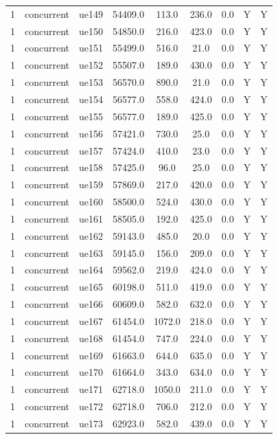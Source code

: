 \begin{table}[ht]
\begin{tabular}{|c|c|c|c|c|c|c|c|c|}
1 & concurrent & ue149 & 54409.0 & 113.0 & 236.0 & 0.0 & Y & Y \\
1 & concurrent & ue150 & 54850.0 & 216.0 & 423.0 & 0.0 & Y & Y \\
1 & concurrent & ue151 & 55499.0 & 516.0 & 21.0 & 0.0 & Y & Y \\
1 & concurrent & ue152 & 55507.0 & 189.0 & 430.0 & 0.0 & Y & Y \\
1 & concurrent & ue153 & 56570.0 & 890.0 & 21.0 & 0.0 & Y & Y \\
1 & concurrent & ue154 & 56577.0 & 558.0 & 424.0 & 0.0 & Y & Y \\
1 & concurrent & ue155 & 56577.0 & 189.0 & 425.0 & 0.0 & Y & Y \\
1 & concurrent & ue156 & 57421.0 & 730.0 & 25.0 & 0.0 & Y & Y \\
1 & concurrent & ue157 & 57424.0 & 410.0 & 23.0 & 0.0 & Y & Y \\
1 & concurrent & ue158 & 57425.0 & 96.0 & 25.0 & 0.0 & Y & Y \\
1 & concurrent & ue159 & 57869.0 & 217.0 & 420.0 & 0.0 & Y & Y \\
1 & concurrent & ue160 & 58500.0 & 524.0 & 430.0 & 0.0 & Y & Y \\
1 & concurrent & ue161 & 58505.0 & 192.0 & 425.0 & 0.0 & Y & Y \\
1 & concurrent & ue162 & 59143.0 & 485.0 & 20.0 & 0.0 & Y & Y \\
1 & concurrent & ue163 & 59145.0 & 156.0 & 209.0 & 0.0 & Y & Y \\
1 & concurrent & ue164 & 59562.0 & 219.0 & 424.0 & 0.0 & Y & Y \\
1 & concurrent & ue165 & 60198.0 & 511.0 & 419.0 & 0.0 & Y & Y \\
1 & concurrent & ue166 & 60609.0 & 582.0 & 632.0 & 0.0 & Y & Y \\
1 & concurrent & ue167 & 61454.0 & 1072.0 & 218.0 & 0.0 & Y & Y \\
1 & concurrent & ue168 & 61454.0 & 747.0 & 224.0 & 0.0 & Y & Y \\
1 & concurrent & ue169 & 61663.0 & 644.0 & 635.0 & 0.0 & Y & Y \\
1 & concurrent & ue170 & 61664.0 & 343.0 & 634.0 & 0.0 & Y & Y \\
1 & concurrent & ue171 & 62718.0 & 1050.0 & 211.0 & 0.0 & Y & Y \\
1 & concurrent & ue172 & 62718.0 & 706.0 & 212.0 & 0.0 & Y & Y \\
1 & concurrent & ue173 & 62923.0 & 582.0 & 439.0 & 0.0 & Y & Y \\

\end{tabular}
\end{table}

